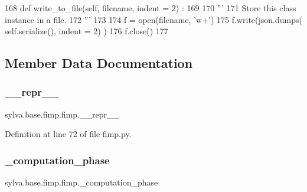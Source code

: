 \begin{DoxyCode}
168     \textcolor{keyword}{def }write\_to\_file(self, filename, indent = 2) :
169 
170       \textcolor{stringliteral}{'''}
171 \textcolor{stringliteral}{        Store this class instance in a file.}
172 \textcolor{stringliteral}{      '''}
173 
174       f = open(filename, \textcolor{stringliteral}{'w+'})
175       f.write(json.dumps( self.serialize(), indent = 2) )
176       f.close()
177 
\end{DoxyCode}


\subsection{Member Data Documentation}
\mbox{\label{classsylva_1_1base_1_1fimp_1_1fimp_a1721d4305e5735e8137e4454e896d1e4}} 
\subsubsection{\texorpdfstring{\+\_\+\+\_\+repr\+\_\+\+\_\+}{\_\_repr\_\_}}
{\footnotesize\ttfamily sylva.\+base.\+fimp.\+fimp.\+\_\+\+\_\+repr\+\_\+\+\_\+\hspace{0.3cm}{\ttfamily [private]}}



Definition at line 72 of file fimp.\+py.

\mbox{\label{classsylva_1_1base_1_1fimp_1_1fimp_a2ded98f1192f049ef6add49430aa5b6f}} 
\subsubsection{\texorpdfstring{\+\_\+computation\+\_\+phase}{\_computation\_phase}}
{\footnotesize\ttfamily sylva.\+base.\+fimp.\+fimp.\+\_\+computation\+\_\+phase\hspace{0.3cm}{\ttfamily [private]}}



